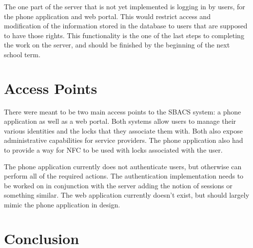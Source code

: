 \documentclass{article}
\begin{document}
The one part of the server that is not yet implemented is logging in by users, for the phone application and web portal.
This would restrict access and modification of the information stored in the database to users that are supposed to have
those rights. This functionality is the one of the last steps to completing the work on the server, and should be finished
by the beginning of the next school term.

\section{Access Points}

There were meant to be two main access points to the SBACS system: a phone application as well as a web portal. Both
systems allow users to manage their various identities and the locks that they associate them with. Both also expose
administrative capabilities for service providers. The phone application also had to provide a way for NFC to be used
with locks associated with the user.

The phone application currently does not authenticate users, but otherwise can perform all of the required actions.
The authentication implementation needs to be worked on in conjunction with the server adding the notion of sessions or
something similar. The web application currently doesn't exist, but should largely mimic the phone application in
design.

\section{Conclusion}
\end{document}
